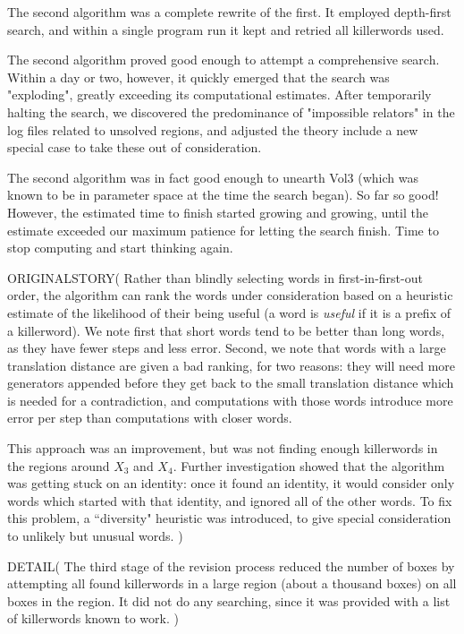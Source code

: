 The second algorithm was a complete rewrite of the first. It employed depth-first search, and within a single program run it kept and retried all killerwords used.

The second algorithm proved good enough to attempt a comprehensive search. Within a day or two, however, it quickly emerged that the search was "exploding", greatly exceeding its computational estimates. After temporarily halting the search, we discovered the predominance of "impossible relators" in the log files related to unsolved regions, and adjusted the theory include a new special case to take these out of consideration.

The second algorithm was in fact good enough to unearth Vol3 (which was known to be in parameter space at the time the search began). So far so good! However, the estimated time to finish started growing and growing, until the estimate exceeded our maximum patience for letting the search finish. Time to stop computing and start thinking again.

ORIGINALSTORY(
Rather than blindly selecting words in first-in-first-out order, 
the algorithm can
rank the words under consideration based on a heuristic estimate of 
the likelihood of their being useful (a word is {\it useful} if it is a prefix of a killerword).  
We note first that short words tend to be better than 
long words, as they have fewer steps and less error.
Second, we note that words 
with a large translation distance are given a bad ranking, for two reasons: 
they will need more generators appended before they get back to the 
small translation distance which is needed for a contradiction, and
 computations with those words introduce more error per step than 
computations with closer words.  

This approach was an improvement, but was not finding enough killerwords in the regions 
around $X_3$ and $X_4$.  Further investigation showed that the 
algorithm was getting stuck on an identity: once it found an identity, 
it would consider only words which started with that identity, and 
ignored all of the other words.  To fix this problem, a ``diversity" 
heuristic was introduced, to give special consideration to unlikely but 
unusual words.
)

DETAIL(
The third stage of the revision process reduced the number of boxes by attempting all found 
killerwords in a large region (about a thousand boxes) on all boxes 
in the region.  It did not  do any searching, since it was provided with a 
list of killerwords known to work.
)

